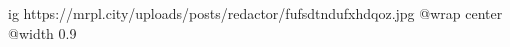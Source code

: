  
 
 
 
 

\ifcmt
  ig https://mrpl.city/uploads/posts/redactor/fufsdtndufxhdqoz.jpg
  @wrap center
  @width 0.9
\fi

